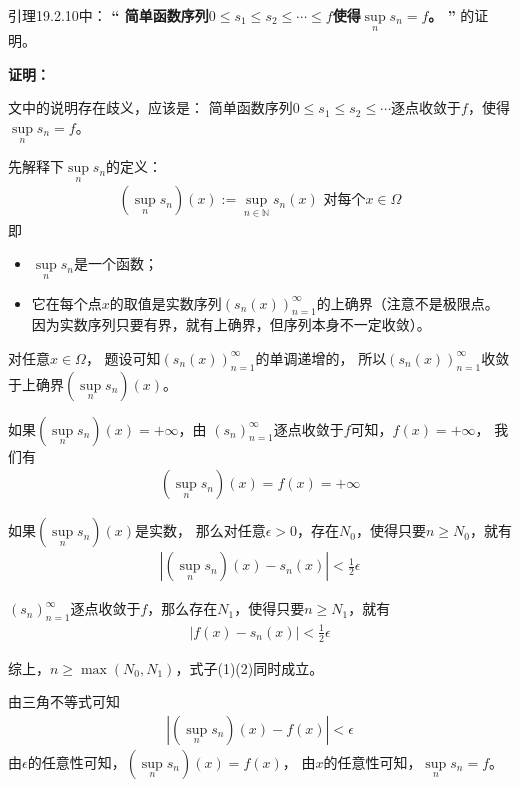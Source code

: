 \documentclass{article}
\begin{document}
\begin{zremark}
  引理19.2.10中：
  \textbf{“
    简单函数序列$0 \leq s_1 \leq s_2 \leq \cdots \leq f$使得$\sup\limits_{n} s_n = f$。
    ”}
  的证明。
\end{zremark}

\textbf{证明：}

文中的说明存在歧义，应该是：
简单函数序列$0 \leq s_1 \leq s_2 \leq \cdots $逐点收敛于$f$，使得$\sup\limits_{n} s_n = f$。

先解释下$\sup\limits_{n} s_n$的定义：
\begin{align*}
  (\sup\limits_{n} s_n)(x) := \sup\limits_{n \in \mathbb{N}} s_n(x) \,\, \text{对每个$x \in \Omega$}
\end{align*}
即
\begin{itemize}
  \item $\sup\limits_{n} s_n$是一个函数；
  \item 它在每个点$x$的取值是实数序列$(s_n(x))_{n = 1}^\infty$的上确界（注意不是极限点。
  因为实数序列只要有界，就有上确界，但序列本身不一定收敛）。
\end{itemize}

对任意$x \in \Omega$，
题设可知$(s_n(x))_{n = 1}^\infty$的单调递增的，
所以$(s_n(x))_{n = 1}^\infty$收敛于上确界$(\sup\limits_{n} s_n)(x)$。

如果$(\sup\limits_{n} s_n)(x) = +\infty$，由
$(s_n)_{n = 1}^\infty$逐点收敛于$f$可知，$f(x) = +\infty$，
我们有
\begin{align*}
  (\sup\limits_{n} s_n)(x) = f(x) = +\infty
\end{align*}

如果$(\sup\limits_{n} s_n)(x)$是实数，
那么对任意$\epsilon > 0$，存在$N_0$，使得只要$n \geq N_0$，就有 
\begin{align}
  |(\sup\limits_{n} s_n)(x) - s_n(x)| < \frac{1}{2}\epsilon
\end{align}

$(s_n)_{n = 1}^\infty$逐点收敛于$f$，那么存在$N_1$，使得只要$n \geq N_1$，就有 
\begin{align}
  |f(x) - s_n(x)| < \frac{1}{2}\epsilon
\end{align}

综上，$n \geq \max(N_0, N_1)$，式子(1)(2)同时成立。

由三角不等式可知
\begin{align*}
  |(\sup\limits_{n} s_n)(x) - f(x)| < \epsilon
\end{align*}
由$\epsilon$的任意性可知，$(\sup\limits_{n} s_n)(x) = f(x)$，
由$x$的任意性可知，$\sup\limits_{n} s_n = f$。
\end{document}
